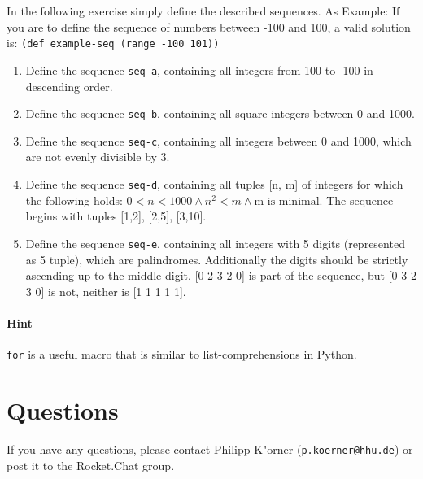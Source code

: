 \documentclass[11pt,a4paper]{article}
\begin{document}
\begin{exercise}[Sequences]

In the following exercise simply define the described sequences. As Example: If you are to define the sequence of numbers between -100 and 100, a valid solution is: \texttt{(def example-seq (range -100 101))}
  

\begin{enumerate}[label=\alph*)]
  \item Define the sequence \verb|seq-a|, containing all integers from 100 to -100 in descending order.
  \item Define the sequence \verb|seq-b|, containing all square integers between 0 and 1000.
  \item Define the sequence \verb|seq-c|, containing all integers between 0 and 1000, which are not evenly divisible by 3.
  \item Define the sequence \verb|seq-d|, containing all tuples [n, m] of integers for which the following holds: $0 < n < 1000 \wedge n^2 < m \wedge \text{m is minimal}$.  The sequence begins with tuples [1,2], [2,5], [3,10].
  \item Define the sequence \verb|seq-e|, containing all integers with 5 digits (represented as 5 tuple), which are palindromes. Additionally the digits should be strictly ascending up to the middle digit. [0 2 3 2 0] is part of the sequence, but [0 3 2 3 0] is not, neither is [1 1 1 1 1].
  
    
  \end{enumerate}

    \paragraph{Hint} \verb|for| is a useful macro that is similar to list-comprehensions in Python. 

\end{exercise}





	\section*{Questions}
	If you have any questions, please contact Philipp K"orner (\texttt{p.koerner@hhu.de}) or post it to the Rocket.Chat group.
\end{document}
